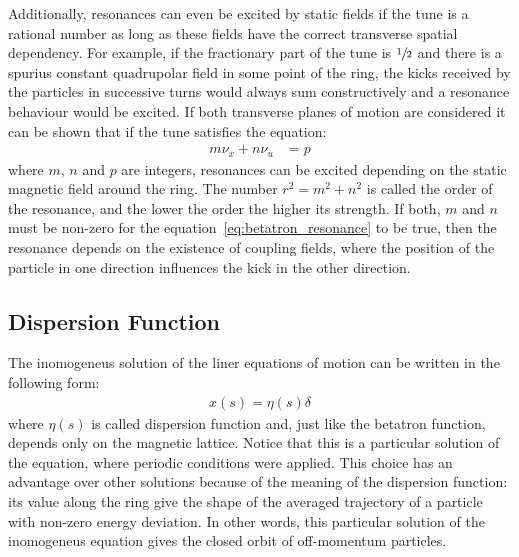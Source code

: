	Additionally, resonances can even be excited by static fields if the tune is a rational number as long as these fields have the correct transverse spatial dependency. For example, if the fractionary part of the tune is $\sfrac12$ and there is a spurius constant quadrupolar field in some point of the ring, the kicks received by the particles in successive turns would always sum constructively and a resonance behaviour would be excited. If both transverse planes of motion are considered it can be shown that if the tune satisfies the equation:
	\begin{align}\label{eq:betatron_resonance}
		m\nu_x + n\nu_u &= p
	\end{align}
	where $m$, $n$ and $p$ are integers, resonances can be excited depending on the static magnetic field around the ring. The number $r^2 = m^2 + n^2$ is called the order of the resonance, and the lower the order the higher its strength. If both, $m$ and $n$ must be non-zero for the equation~\eqref{eq:betatron_resonance} to be true, then the resonance depends on the existence of coupling fields, where the position of the particle in one direction influences the kick in the other direction.

\subsection{Dispersion Function}

	The inomogeneus solution of the liner equations of motion can be written in the following form:
	\begin{align}
		x(s) = \eta(s)\delta
	\end{align}
	where $\eta(s)$ is called dispersion function and, just like the betatron function, depends only on the magnetic lattice. Notice that this is a particular solution of the equation, where periodic conditions were applied. This choice has an advantage over other solutions because of the meaning of the dispersion function: its value along the ring give the shape of the averaged trajectory of a particle with non-zero energy deviation. In other words, this particular solution of the inomogeneus equation gives the closed orbit of off-momentum particles.

